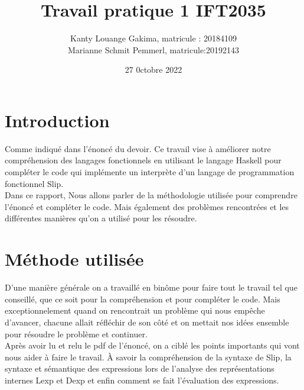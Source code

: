 \documentclass{article}
\title{Travail pratique 1 IFT2035}
\author{Kanty Louange Gakima, matricule : 20184109 \\ Marianne Schmit Pemmerl, matricule:20192143 }
\date{27 0ctobre 2022}
\begin{document}
\maketitle

\newcommand \mML {\ensuremath\mu\textsl{ML}}
\newcommand \kw [1] {\textsf{#1}}
\newcommand \id [1] {\textsl{#1}}
\newcommand \punc [1] {\kw{`#1'}}
\newcommand \str [1] {\texttt{"#1"}}
\newenvironment{outitemize}{
  \begin{itemize}
  \let \origitem \item \def \item {\origitem[]\hspace{-18pt}}
}{
  \end{itemize}
}
\newcommand \Align [2][t] {
  \begin{array}[#1]{@{}l}
    #2
  \end{array}}

\section{Introduction}


Comme indiqué dans l'énoncé du devoir. Ce travail vise à améliorer notre compréhension des langages fonctionnels en utilisant le langage Haskell pour compléter le code qui implémente un interprète d'un langage de programmation fonctionnel Slip.\\ 
Dans ce rapport, Nous allons parler de la méthodologie utilisée pour comprendre l'énoncé et compléter le code. Mais également des problèmes rencontrées et les différentes manières qu'on a utilisé pour les résoudre.

\section{Méthode utilisée}
D'une manière générale on a travaillé en binôme pour faire tout le travail tel que conseillé, que ce soit pour la compréhension et pour compléter le code. Mais exceptionnelement quand on rencontrait un problème qui nous empêche d'avancer, chacune allait réfléchir de son côté et on mettait nos idées ensemble pour résoudre le problème et continuer.\\

Après avoir lu et relu le pdf de l'énoncé, on a ciblé les points importants qui vont nous aider à faire le travail.
À savoir la compréhension de la syntaxe de Slip, la syntaxe et sémantique des expressions lors de l’analyse des représentations internes Lexp et Dexp et enfin comment se fait l'évaluation des expressions. 
\end{document}
